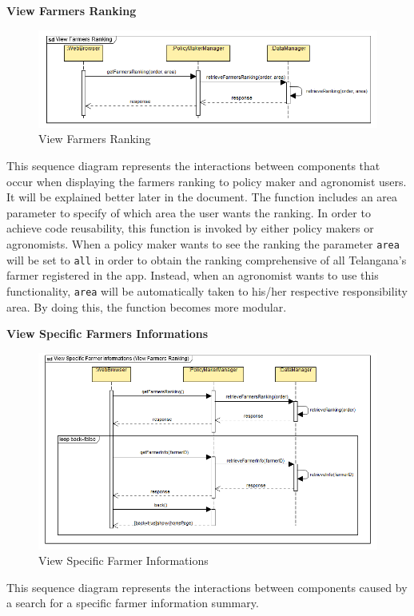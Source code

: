 \documentclass[table, 12pt]{article}
\begin{document}
\newpage
\textbf{View Farmers Ranking}
\begin{center}
    \begin{figure}[H]
        \includegraphics[scale=0.85, center]{assets/SequenceDiagram/ViewFarmersRanking.png}
        \caption{View Farmers Ranking}
        \label{fig: ranking}
    \end{figure}
\end{center}
This sequence diagram represents the interactions between components that occur when displaying the farmers ranking to policy maker and agronomist users.
It will be explained better later in the document. %
The function includes an area parameter to specify of which area the user wants the ranking.
In order to achieve code reusability, this function is invoked by either policy makers or agronomists. 
When a policy maker wants to see the ranking the parameter \texttt{area} will be set to \texttt{all} in order to obtain the ranking comprehensive of all Telangana's farmer registered in the app.
Instead, when an agronomist wants to use this functionality, \texttt{area} will be automatically taken to his/her respective responsibility area. By doing this, the function becomes more modular.

\newpage
\textbf{View Specific Farmers Informations}
\begin{center}
    \begin{figure}[H]
        \includegraphics[scale=0.8, center]{assets/SequenceDiagram/ViewSpecificFarmerInformations.png}
        \caption{View Specific Farmer Informations}
        \label{fig: specificFarmerInfo}
    \end{figure}
\end{center}
This sequence diagram represents the interactions between components caused by a search for a specific farmer information summary.
\end{document}
